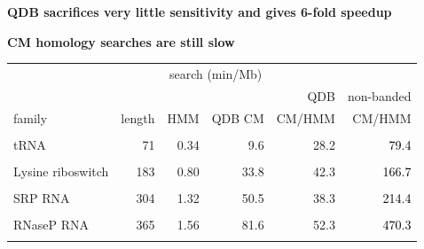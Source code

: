 \documentclass[landscape]{slides}
\begin{document}
\begin{slide}
\begin{center}
\textbf{QDB sacrifices very little sensitivity and gives 6-fold speedup}
\end{center}


\vfill
\end{slide}

\begin{slide}
\begin{center}
\textbf{CM homology searches are still slow}
\end{center}

\small
\begin{center}
\small
\begin{tabular}{lr|rr|r|r}
                  &        & \multicolumn{2}{c|}{search (min/Mb)} & \multicolumn{2}{c}{}\\ \cline{3-4}
                  &        &        &        & \textcolor{mygreen}{QDB}  & non-banded        \\
family            & length & HMM    & \textcolor{mygreen}{QDB CM} & \textcolor{mygreen}{CM/HMM} & CM/HMM  \\ \hline
                  &        &        &        &            &         \\
tRNA              & 71     &  0.34  &  \textcolor{mygreen}{9.6}   & \textcolor{mygreen}{28.2} & \textcolor{black}{79.4}\\
                  &        &        &        &            &         \\
Lysine riboswitch & 183    &  0.80  &  \textcolor{mygreen}{33.8}  & \textcolor{mygreen}{42.3} & \textcolor{black}{166.7}\\
                  &        &        &        &            &         \\
SRP RNA           & 304    &  1.32  &  \textcolor{mygreen}{50.5}  & \textcolor{mygreen}{38.3} & \textcolor{black}{214.4}\\
                  &        &        &        &            &         \\
RNaseP RNA        & 365    &  1.56  &  \textcolor{mygreen}{81.6}  & \textcolor{mygreen}{52.3} & \textcolor{black}{470.3}\\
                  &        &        &        &            &         \\
\end{tabular}
\end{center}


\end{slide}
\end{document}
